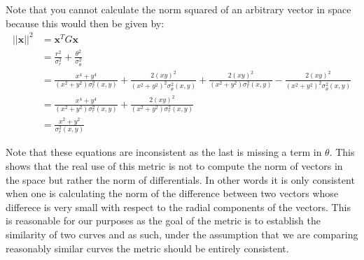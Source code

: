 \documentclass{article}
\begin{document}
Note that you cannot calculate the norm squared of an arbitrary vector in space because this would then be given by:
\begin{subequations}
\begin{align}
||\mathbf{x}||^2 &= \mathbf{x}^TG\mathbf{x} \\
                 &= \frac{r^2}{\sigma_r^2} + \frac{\theta^2}{\sigma_\theta^2}\\
                 &= \frac{x^4+y^4}{(x^2+y^2)\sigma_r^2(x,y)} + \frac{2(xy)^2}{(x^2+y^2)^2\sigma_\theta^2(x,y)}+\frac{2(xy)^2}{(x^2+y^2)\sigma^2_r(x,y)} -\frac{2(xy)^2}{(x^2+y^2)^2\sigma_\theta^2(x,y)}\\
                 &= \frac{x^4+y^4}{(x^2+y^2)\sigma_r^2(x,y)}+\frac{2(xy)^2}{(x^2+y^2)\sigma^2_r(x,y)}\\
                 &= \frac{x^2+y^2}{\sigma^2_r(x,y)}
\end{align}
\end{subequations}

Note that these equations are inconsistent as the last is missing a term in $\theta$. This shows that the real use of this metric is not to compute the norm of vectors in the space but rather the norm of differentials. In other words it is only consistent when one is calculating the norm of the difference between two vectors whose differece is very small with respect to the radial components of the vectors. This is reasonable for our purposes as the goal of the metric is to establish the similarity of two curves and as such, under the assumption that we are comparing reasonably similar curves the metric should be entirely consistent.
\end{document}
